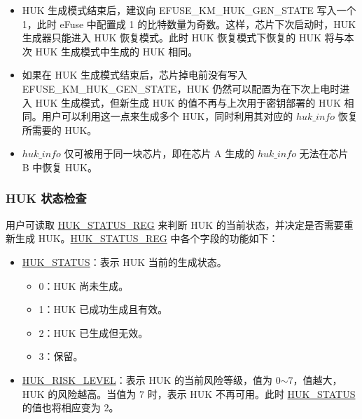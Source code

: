 \documentclass[main\_\_CN.tex]{subfiles}
\begin{document}
\vspace{-0.5em}
\begin{tiplisting}
\vspace{-2em}
\begin{itemize}
    \item HUK 生成模式结束后，建议向 EFUSE\_KM\_HUK\_GEN\_STATE 写入一个 1，此时 eFuse 中配置成 1 的比特数量为奇数。这样，芯片下次启动时，HUK 生成器只能进入 HUK 恢复模式。此时 HUK 恢复模式下恢复的 HUK 将与本次 HUK 生成模式中生成的 HUK 相同。
    \item 如果在 HUK 生成模式结束后，芯片掉电前没有写入 EFUSE\_KM\_HUK\_GEN\_STATE，HUK 仍然可以配置为在下次上电时进入 HUK 生成模式，但新生成 HUK 的值不再与上次用于密钥部署的 HUK 相同。用户可以利用这一点来生成多个 HUK，同时利用其对应的 \hyperref[para:hukinfo]{\begin{math}huk\_info\end{math}} 恢复所需要的 HUK。
    \item \hyperref[para:hukinfo]{\begin{math}huk\_info\end{math}} 仅可被用于同一块芯片，即在芯片 A 生成的 \hyperref[para:hukinfo]{\begin{math}huk\_info\end{math}} 无法在芯片 B 中恢复 HUK。
\end{itemize}
\end{tiplisting}

\subsubsection{HUK 状态检查}
用户可读取 \hyperref[regdesc:HUKSTATUSREG]{HUK\_STATUS\_REG} 来判断 HUK 的当前状态，并决定是否需要重新生成 HUK。\hyperref[regdesc:HUKSTATUSREG]{HUK\_STATUS\_REG} 中各个字段的功能如下：
\begin{itemize}
    \item \hyperref[fielddesc:HUKSTATUS]{HUK\_STATUS}：表示 HUK 当前的生成状态。
    \begin{itemize}
        \item 0：HUK 尚未生成。
        \item 1：HUK 已成功生成且有效。
        \item 2：HUK 已生成但无效。
        \item 3：保留。
    \end{itemize}
    \item \hyperref[fielddesc:HUKRISKLEVEL]{HUK\_RISK\_LEVEL}：表示 HUK 的当前风险等级，值为 0$\sim$7，值越大，HUK 的风险越高。当值为 7 时，表示 HUK 不再可用。此时  \hyperref[fielddesc:HUKSTATUS]{HUK\_STATUS} 的值也将相应变为 2。
\end{itemize}
\end{document}
